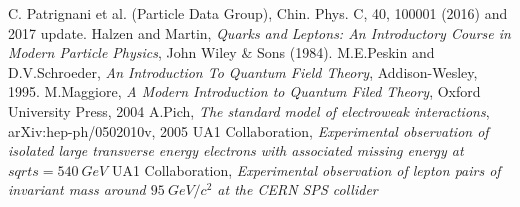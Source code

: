 \begin{thebibliography}{999}

		 C. Patrignani et al. (Particle Data Group), Chin. Phys. C, 40, 100001 (2016) and 2017 update.
		 Halzen and Martin, \emph{Quarks and Leptons: An Introductory Course in Modern Particle Physics}, John Wiley \& Sons (1984).
		 M.E.Peskin and D.V.Schroeder, \emph{An Introduction To Quantum Field Theory}, Addison-Wesley, 1995.
		 M.Maggiore, \emph{A Modern Introduction to Quantum Filed Theory}, Oxford University Press, 2004
		 A.Pich, \emph{The standard model of electroweak interactions}, arXiv:hep-ph/0502010v,  2005
		  UA1 Collaboration, \emph{Experimental observation of isolated large transverse energy electrons with associated missing energy at $sqrt{s}=540~GeV$}
		 UA1 Collaboration, \emph{Experimental observation of lepton pairs of invariant mass around $95~GeV/c^{2}$ at the CERN SPS collider}

				
           	  
	 
	 \end{thebibliography}
\clearpage{\pagestyle{empty}\cleardoublepage}